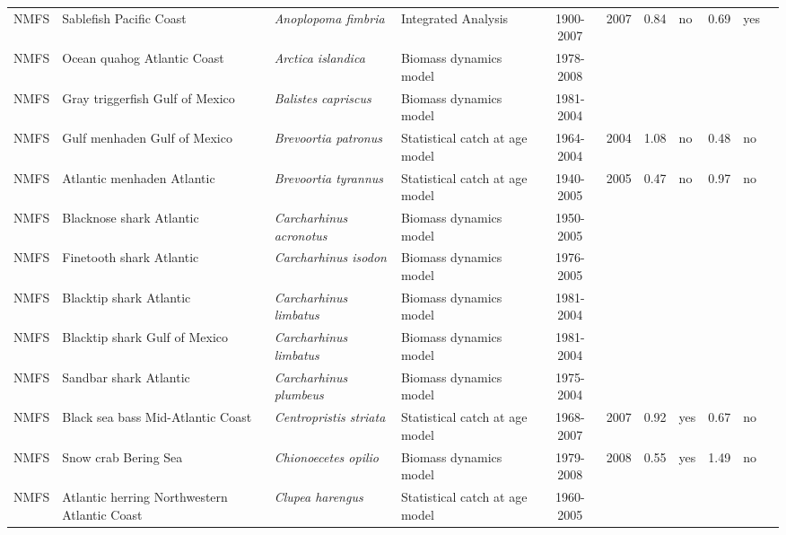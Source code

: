\begin{longtable}{p{1.8cm}p{3.5cm}p{3.5cm}p{3cm}cccp{0.9cm}cp{0.9cm}c}
  NMFS & Sablefish Pacific Coast & \textit{Anoplopoma fimbria} & Integrated Analysis & 1900-2007 & 2007 & 0.84 & no & 0.69 & yes & \cite{NWFSC-SABLEFPCOAST-2007-Sablefish.pdf} \\ 
  NMFS & Ocean quahog Atlantic Coast & \textit{Arctica islandica} & Biomass dynamics model & 1978-2008 &  &  &  &  &  & \cite{quahog.pdf} \\ 
  NMFS & Gray triggerfish Gulf of Mexico & \textit{Balistes capriscus} & Biomass dynamics model & 1981-2004 &  &  &  &  &  & \cite{JENSEN_GTRIGGM_2006.pdf} \\ 
  NMFS & Gulf menhaden Gulf of Mexico & \textit{Brevoortia patronus} & Statistical catch at age model & 1964-2004 & 2004 & 1.08 & no & 0.48 & no & \cite{GILROY-MENHADENGM-2007.pdf} \\ 
  NMFS & Atlantic menhaden Atlantic & \textit{Brevoortia tyrannus} & Statistical catch at age model & 1940-2005 & 2005 & 0.47 & no & 0.97 & no & \cite{Atl.Menhaden-ASMFC-2006.pdf} \\ 
  NMFS & Blacknose shark Atlantic & \textit{Carcharhinus acronotus} & Biomass dynamics model & 1950-2005 &  &  &  &  &  & \cite{SmallcoastalAtl2007-SEFSC.pdf} \\ 
  NMFS & Finetooth shark Atlantic & \textit{Carcharhinus isodon} & Biomass dynamics model & 1976-2005 &  &  &  &  &  & \cite{SmallcoastalAtl2007-SEFSC.pdf} \\ 
  NMFS & Blacktip shark Atlantic & \textit{Carcharhinus limbatus} & Biomass dynamics model & 1981-2004 &  &  &  &  &  & \cite{LargeCoastalAtl2006-SEFSC.pdf} \\ 
  NMFS & Blacktip shark Gulf of Mexico & \textit{Carcharhinus limbatus} & Biomass dynamics model & 1981-2004 &  &  &  &  &  & \cite{LargeCoastalAtl2006-SEFSC.pdf} \\ 
  NMFS & Sandbar shark Atlantic & \textit{Carcharhinus plumbeus} & Biomass dynamics model & 1975-2004 &  &  &  &  &  & \cite{LargeCoastalAtl2006-SEFSC.pdf} \\ 
  NMFS & Black sea bass Mid-Atlantic Coast & \textit{Centropristis striata} & Statistical catch at age model & 1968-2007 & 2007 & 0.92 & yes & 0.67 & no & \cite{DataPoorReviewPanelReportFinal-1-20-09.pdf} \\ 
  NMFS & Snow crab Bering Sea & \textit{Chionoecetes opilio} & Biomass dynamics model & 1979-2008 & 2008 & 0.55 & yes & 1.49 & no & \cite{CRABSAFE2008.pdf} \\ 
  NMFS & Atlantic herring Northwestern Atlantic Coast & \textit{Clupea harengus} & Statistical catch at age model & 1960-2005 &  &  &  &  &  & \cite{Herring2006.pdf} \\ 

\end{longtable}
